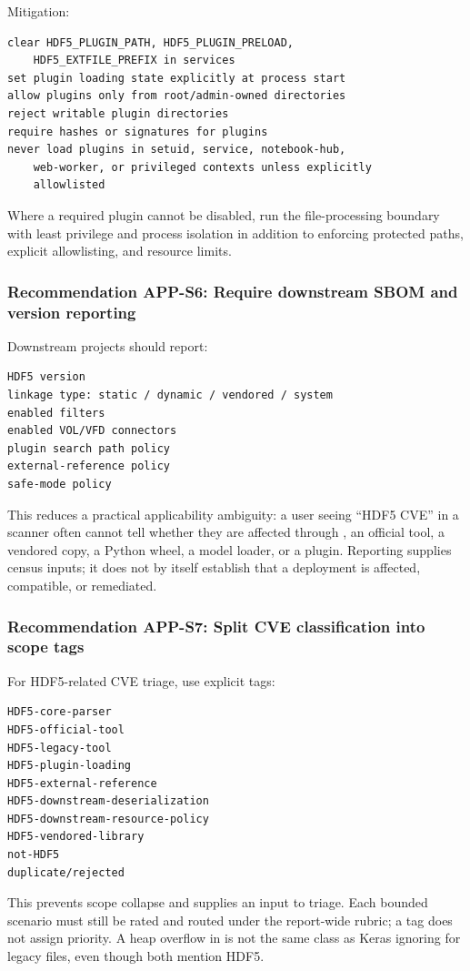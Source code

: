 \documentclass[../main.tex]{subfiles}
\begin{document}
Mitigation:
\begin{verbatim}
clear HDF5_PLUGIN_PATH, HDF5_PLUGIN_PRELOAD,
    HDF5_EXTFILE_PREFIX in services
set plugin loading state explicitly at process start
allow plugins only from root/admin-owned directories
reject writable plugin directories
require hashes or signatures for plugins
never load plugins in setuid, service, notebook-hub,
    web-worker, or privileged contexts unless explicitly
    allowlisted
\end{verbatim}

Where a required plugin cannot be disabled, run the file-processing boundary
with least privilege and process isolation in addition to enforcing protected
paths, explicit allowlisting, and resource limits.

\subsubsection*{Recommendation APP-S6: Require downstream SBOM and version reporting}

Downstream projects should report:
\begin{verbatim}
HDF5 version
linkage type: static / dynamic / vendored / system
enabled filters
enabled VOL/VFD connectors
plugin search path policy
external-reference policy
safe-mode policy
\end{verbatim}

This reduces a practical applicability ambiguity: a user seeing “HDF5 CVE” in a
scanner often cannot tell whether they are affected through
, an official tool, a vendored copy, a Python wheel,
a model loader, or a plugin. Reporting supplies census inputs; it does not by
itself establish that a deployment is affected, compatible, or remediated.

\subsubsection*{Recommendation APP-S7: Split CVE classification into scope tags}

For HDF5-related CVE triage, use explicit tags:
\begin{verbatim}
HDF5-core-parser
HDF5-official-tool
HDF5-legacy-tool
HDF5-plugin-loading
HDF5-external-reference
HDF5-downstream-deserialization
HDF5-downstream-resource-policy
HDF5-vendored-library
not-HDF5
duplicate/rejected
\end{verbatim}

This prevents scope collapse and supplies an input to triage. Each bounded
scenario must still be rated and routed under the report-wide rubric; a tag
does not assign priority. A heap overflow in
 is not the same class as Keras
ignoring  for legacy  files, even though both
mention HDF5.
\end{document}
